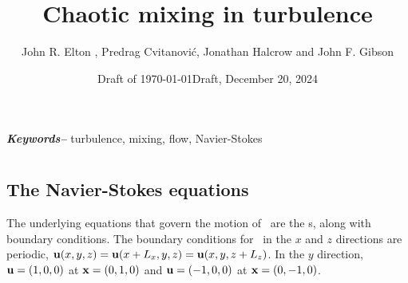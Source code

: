 \documentclass[lineno]{jfm}
\providecommand{\keywords}[1]
{
  \small	
  \textbf{\emph{Keywords--}} #1
}
\begin{document}
        \ifboyscout
\date{{\color{blue}Draft of \today}} %
        \else
\date{Draft, December 20, 2024}
        \fi 

\title[Mixing in {\pC} turbulence]
      {Chaotic mixing in {\pC} turbulence}


\author[J. R. Elton, P. Cvitanovi\'c, J. Halcrow and J. F. Gibson]
        {John R. Elton
            , 
            Predrag Cvitanovi\'c, 
            Jonathan Halcrow 
            and 
            John F. Gibson
        }


\maketitle

\begin{abstract}    %
    
\end{abstract}       %

\keywords{turbulence, mixing, {\pC} flow, Navier-Stokes}

     


\section{{\PCf}}
\label{s:PCF}

\subsection{The Navier-Stokes equations}
\label{s:NS}
 The underlying equations
that govern the motion of \pCf\ are the {\NSe}s,
along with boundary conditions. The boundary conditions for \pCf\ in the $x$
and $z$ directions are periodic,
 $ {\bf u}(x, y, z) = {\bf u}(x+L_x, y, z) =
{\bf u}(x, y, z + L_z) $.
 In the $y$ direction,
 ${\bf u} = (1,0,0)$ at ${\bf x} = (0,1,0)$ and ${\bf u} = (-1,0,0)$ at ${\bf x} =
 (0,-1,0)$.
\end{document}
